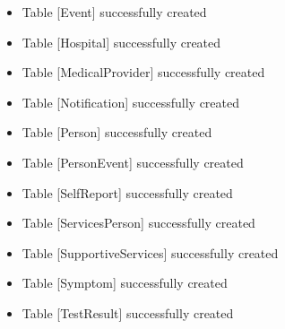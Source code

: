 \documentclass[
]{article}
\providecommand{\tightlist}{%
  \setlength{\itemsep}{0pt}\setlength{\parskip}{0pt}}
\begin{document}
\begin{itemize}
\tightlist
\item
  Table {[}Event{]} successfully created
\end{itemize}

\begin{itemize}
\tightlist
\item
  Table {[}Hospital{]} successfully created
\end{itemize}

\begin{itemize}
\tightlist
\item
  Table {[}MedicalProvider{]} successfully created
\end{itemize}

\begin{itemize}
\tightlist
\item
  Table {[}Notification{]} successfully created
\end{itemize}

\begin{itemize}
\tightlist
\item
  Table {[}Person{]} successfully created
\end{itemize}

\begin{itemize}
\tightlist
\item
  Table {[}PersonEvent{]} successfully created
\end{itemize}

\begin{itemize}
\tightlist
\item
  Table {[}SelfReport{]} successfully created
\end{itemize}

\begin{itemize}
\tightlist
\item
  Table {[}ServicesPerson{]} successfully created
\end{itemize}

\begin{itemize}
\tightlist
\item
  Table {[}SupportiveServices{]} successfully created
\end{itemize}

\begin{itemize}
\tightlist
\item
  Table {[}Symptom{]} successfully created
\end{itemize}

\begin{itemize}
\tightlist
\item
  Table {[}TestResult{]} successfully created
\end{itemize}
\end{document}
